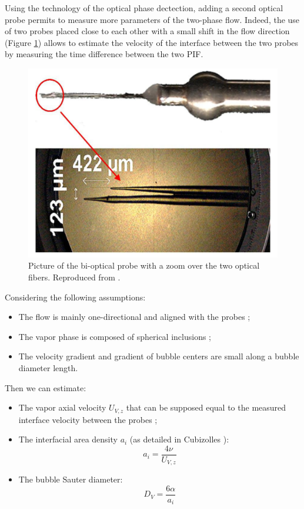 Using the technology of the optical phase dectection, adding a second optical probe permits to measure more parameters of the two-phase flow. Indeed, the use of two probes placed close to each other with a small shift in the flow direction (Figure \ref{fig:optical_probe}) allows to estimate the velocity of the interface between the two probes by measuring the time difference between the two PIF.


\begin{figure}[!h]
\centering
\includegraphics[width=0.65\linewidth]{img/DEBORA/optical_probe.png}
\caption{Picture of the bi-optical probe with a zoom over the two optical fibers. Reproduced from \cite{gueguen_contribution_2013}.}
\label{fig:optical_probe}
\end{figure}

\npar

Considering the following assumptions:

\begin{itemize}
\item The flow is mainly one-directional and aligned with the probes ;
\item The vapor phase is composed of spherical inclusions ;
\item The velocity gradient and gradient of bubble centers are small along a bubble diameter length.
\end{itemize}

Then we can estimate: 

\begin{itemize}
\item The vapor axial velocity $U_{V,z}$ that can be supposed equal to the measured interface velocity between the probes ;
\item The interfacial area density $a_{i}$ (as detailed in Cubizolles \cite{cubizolles_etude_1996}):
\begin{equation}
a_{i} = \frac{4 \nu }{U_{V,z}}
\label{eq:interfacial_area_debora}
\end{equation}
\item The bubble Sauter diameter:
\begin{equation}
D_{V} = \frac{6 \alpha }{a_{i}}
\label{eq:dV_debora}
\end{equation}
\end{itemize}



